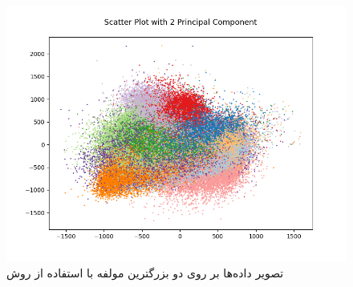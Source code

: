 \documentclass[12pt, a4paper]{article}
\begin{document}
\begin{figure}[h]
    \centering
    \includegraphics[width=0.7\linewidth]{images/q4/a/projection_to_2d.png}
    \caption{تصویر داده‌ها بر روی دو بزرگترین مولفه با استفاده از روش }
    \label{pca_2d_projection}
\end{figure}
\end{document}
